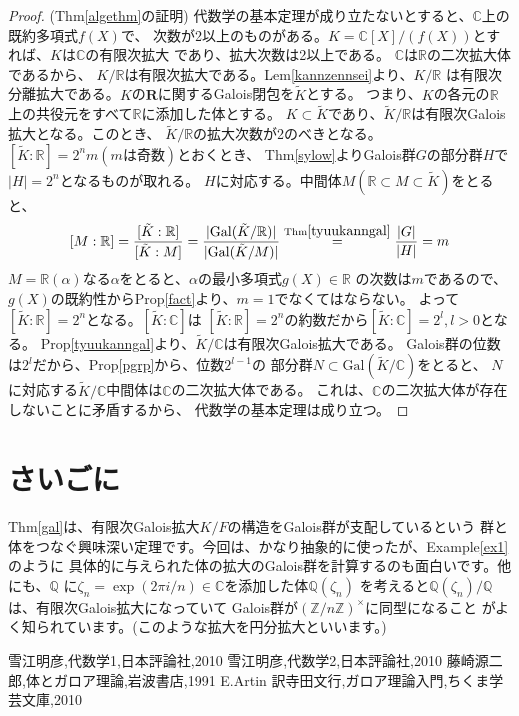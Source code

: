 \documentclass{ltjsarticle}
\theoremstyle{definition}
\begin{document}
\begin{proof}(Thm\ref{algethm}の証明)
代数学の基本定理が成り立たないとすると、$\mathbb{C}$上の既約多項式$f(X)$で、
次数が2以上のものがある。$K=\mathbb{C}[X]/(f(X))$とすれば、$K$は$\mathbb{C}$の有限次拡大
であり、拡大次数は2以上である。 $\mathbb{C}$は$\mathbb{R}$の二次拡大体であるから、
$K/\mathbb{R}$は有限次拡大である。Lem\ref{kannzennsei}より、$K/\mathbb{R}$
は有限次分離拡大である。$K$の$\mathbf{R}$に関するGalois閉包を$\tilde{K}$とする。
つまり、$K$の各元の$\mathbb{R}$上の共役元をすべて$\mathbb{R}$に添加した体とする。
$K\subset\tilde{K}$であり、$\tilde{K}/\mathbb{R}$は有限次Galois拡大となる。このとき、
$\tilde{K}/\mathbb{R}$の拡大次数が2のべきとなる。\\
$[\tilde{K}:\mathbb{R}]=2^nm(m\mathrm{は奇数})$とおくとき、
Thm\ref{sylow}よりGalois群$G$の部分群$H$で$|H|=2^n$となるものが取れる。
$H$に対応する。中間体$M(\mathbb{R}\subset M\subset \tilde{K})$をとると、
\[[M:\mathbb{R}]=\frac{[\tilde{K}:\mathbb{R}]}{[\tilde{K}:M]}
                =\frac{|\mathrm{Gal}(\tilde{K}/\mathbb{R})|}{|\mathrm{Gal}(\tilde{K}/M)|}
                \overset{\mathrm{Thm}\ref{tyuukanngal}}{=}\frac{|G|}{|H|}
                =m\]
$M=\mathbb{R}(\alpha)$なる$\alpha$をとると、$\alpha$の最小多項式$g(X)\in\mathbb{R}$
の次数は$m$であるので、$g(X)$の既約性からProp\ref{fact}より、$m=1$でなくてはならない。
よって$[\tilde{K}:\mathbb{R}]=2^n$となる。$[\tilde{K}:\mathbb{C}]$は
$[\tilde{K}:\mathbb{R}]=2^n$の約数だから$[\tilde{K}:\mathbb{C}]=2^l,l>0$となる。
Prop\ref{tyuukanngal}より、$\tilde{K}/\mathbb{C}$は有限次Galois拡大である。
Galois群の位数は$2^l$だから、Prop\ref{pgrp}から、位数$2^{l-1}$の
部分群$N\subset \mathrm{Gal}(\tilde{K}/\mathbb{C})$をとると、
$N$に対応する$\tilde{K}/\mathbb{C}$中間体は$\mathbb{C}$の二次拡大体である。
これは、$\mathbb{C}$の二次拡大体が存在しないことに矛盾するから、
代数学の基本定理は成り立つ。
\end{proof}
\newpage
\section{さいごに}
Thm\ref{gal}は、有限次Galois拡大$K/F$の構造をGalois群が支配しているという
群と体をつなぐ興味深い定理です。今回は、かなり抽象的に使ったが、Example\ref{ex1}のように
具体的に与えられた体の拡大のGalois群を計算するのも面白いです。他にも、$\mathbb{Q}$
に$\zeta _n=\exp (2\pi i/n)\in\mathbb{C}$を添加した体$\mathbb{Q}(\zeta_n)$
を考えると$\mathbb{Q}(\zeta _n)/\mathbb{Q}$は、有限次Galois拡大になっていて
Galois群が$\left(\mathbb{Z}/n\mathbb{Z}\right)^{\times}$に同型になること
がよく知られています。(このような拡大を円分拡大といいます。)

\begin{thebibliography}{10}
 \newblock 雪江明彦,代数学1,日本評論社,2010
 \newblock 雪江明彦,代数学2,日本評論社,2010
 \newblock 藤崎源二郎,体とガロア理論,岩波書店,1991
 \newblock E.Artin 訳寺田文行,ガロア理論入門,ちくま学芸文庫,2010
\end{thebibliography}
\end{document}
